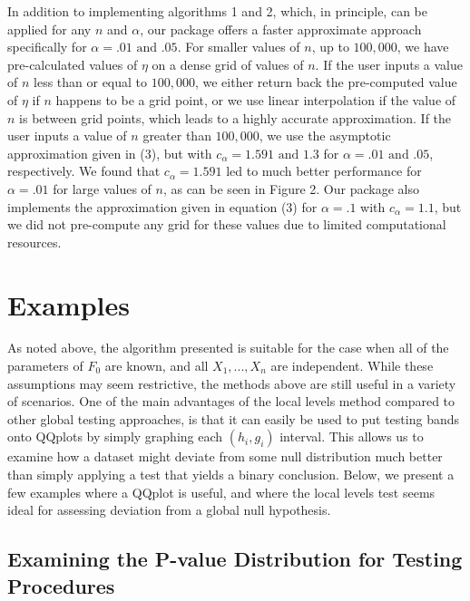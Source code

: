 \documentclass[article]{jss}
\begin{document}
\newline
\newline
In addition to implementing algorithms 1 and 2, which, in principle, can be applied for any $n$ and $\alpha$, our package offers a faster approximate approach specifically for $\alpha = .01 \textrm{ and } .05$. For smaller values of $n$, up to $100,000$, we have pre-calculated values of $\eta$ on a dense grid of values of $n$. If the user inputs a value of $n$ less than or equal to $100,000$, we either return back the pre-computed value of $\eta$ if $n$ happens to be a grid point, or we use linear interpolation if the value of $n$ is between grid points, which leads to a highly accurate approximation. If the user inputs a value of $n$ greater than $100,000$, we use the asymptotic approximation given in (3), but with $c_{\alpha} = 1.591 \textrm{ and } 1.3$ for $\alpha = .01 \textrm{ and } .05$, respectively. We found that $c_{\alpha} = 1.591$ led to much better performance for $\alpha = .01$ for large values of $n$, as can be seen in Figure 2. Our package also implements the approximation given in equation (3) for $\alpha = .1$ with $c_{\alpha} = 1.1$, but we did not pre-compute any grid for these values due to limited computational resources.
\section{Examples}
\label{sec:examples}
As noted above, the algorithm presented is suitable for the case when all of the parameters of $F_{0}$ are known, and all $X_{1}, ..., X_{n}$ are independent. While these assumptions may seem restrictive, the methods above are still useful in a variety of scenarios.
\newline
\newline
One of the main advantages of the local levels method compared to other global testing approaches, is that it can easily be used to put testing bands onto QQplots by simply graphing each $(h_{i}, g_{i})$ interval. This allows us to examine how a dataset might deviate from some null distribution much better than simply applying a test that yields a binary conclusion. Below, we present a few examples where a QQplot is useful, and where the local levels test seems ideal for assessing deviation from a global null hypothesis.

\subsection{Examining the P-value Distribution for Testing Procedures}
\end{document}
